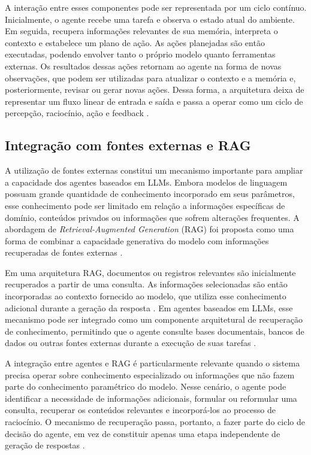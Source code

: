 A interação entre esses componentes pode ser representada por um ciclo contínuo. Inicialmente, o agente recebe uma tarefa e observa o estado atual do ambiente. Em seguida, recupera informações relevantes de sua memória, interpreta o contexto e estabelece um plano de ação. As ações planejadas são então executadas, podendo envolver tanto o próprio modelo quanto ferramentas externas. Os resultados dessas ações retornam ao agente na forma de novas observações, que podem ser utilizadas para atualizar o contexto e a memória e, posteriormente, revisar ou gerar novas ações. Dessa forma, a arquitetura deixa de representar um fluxo linear de entrada e saída e passa a operar como um ciclo de percepção, raciocínio, ação e feedback \cite{muller1999,cheng2026,zhao2026survey}.

\subsection{Integração com fontes externas e RAG}

A utilização de fontes externas constitui um mecanismo importante para ampliar a capacidade dos agentes baseados em LLMs. Embora modelos de linguagem possuam grande quantidade de conhecimento incorporado em seus parâmetros, esse conhecimento pode ser limitado em relação a informações específicas de domínio, conteúdos privados ou informações que sofrem alterações frequentes. A abordagem de \textit{Retrieval-Augmented Generation} (RAG) foi proposta como uma forma de combinar a capacidade generativa do modelo com informações recuperadas de fontes externas \cite{lewis2020rag}.

Em uma arquitetura RAG, documentos ou registros relevantes são inicialmente recuperados a partir de uma consulta. As informações selecionadas são então incorporadas ao contexto fornecido ao modelo, que utiliza esse conhecimento adicional durante a geração da resposta \cite{lewis2020rag}. Em agentes baseados em LLMs, esse mecanismo pode ser integrado como um componente arquitetural de recuperação de conhecimento, permitindo que o agente consulte bases documentais, bancos de dados ou outras fontes externas durante a execução de suas tarefas \cite{zhao2026survey}.

A integração entre agentes e RAG é particularmente relevante quando o sistema precisa operar sobre conhecimento especializado ou informações que não fazem parte do conhecimento paramétrico do modelo. Nesse cenário, o agente pode identificar a necessidade de informações adicionais, formular ou reformular uma consulta, recuperar os conteúdos relevantes e incorporá-los ao processo de raciocínio. O mecanismo de recuperação passa, portanto, a fazer parte do ciclo de decisão do agente, em vez de constituir apenas uma etapa independente de geração de respostas \cite{lewis2020rag,zhao2026survey}.

